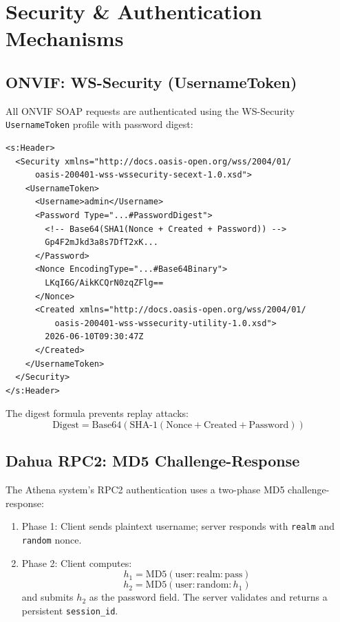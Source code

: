 \documentclass[12pt,a4paper]{article}
\begin{document}
\section{Security \& Authentication Mechanisms}

\subsection{ONVIF: WS-Security (UsernameToken)}
All ONVIF SOAP requests are authenticated using the WS-Security \texttt{UsernameToken} profile with password digest:

\begin{lstlisting}[style=xmlstyle, caption=WS-Security UsernameToken Header]
<s:Header>
  <Security xmlns="http://docs.oasis-open.org/wss/2004/01/
      oasis-200401-wss-wssecurity-secext-1.0.xsd">
    <UsernameToken>
      <Username>admin</Username>
      <Password Type="...#PasswordDigest">
        <!-- Base64(SHA1(Nonce + Created + Password)) -->
        Gp4F2mJkd3a8s7DfT2xK...
      </Password>
      <Nonce EncodingType="...#Base64Binary">
        LKqI6G/AikKCQrN0zqZFlg==
      </Nonce>
      <Created xmlns="http://docs.oasis-open.org/wss/2004/01/
          oasis-200401-wss-wssecurity-utility-1.0.xsd">
        2026-06-10T09:30:47Z
      </Created>
    </UsernameToken>
  </Security>
</s:Header>
\end{lstlisting}

The digest formula prevents replay attacks:
\[
\text{Digest} = \text{Base64}(\text{SHA-1}(\text{Nonce} + \text{Created} + \text{Password}))
\]

\subsection{Dahua RPC2: MD5 Challenge-Response}
The Athena system's RPC2 authentication uses a two-phase MD5 challenge-response:
\begin{enumerate}
    \item Phase 1: Client sends plaintext username; server responds with \texttt{realm} and \texttt{random} nonce.
    \item Phase 2: Client computes:
    \[
    h_1 = \text{MD5}(\text{user} : \text{realm} : \text{pass})
    \]
    \[
    h_2 = \text{MD5}(\text{user} : \text{random} : h_1)
    \]
    and submits $h_2$ as the password field. The server validates and returns a persistent \texttt{session\_id}.
\end{enumerate}
\end{document}
